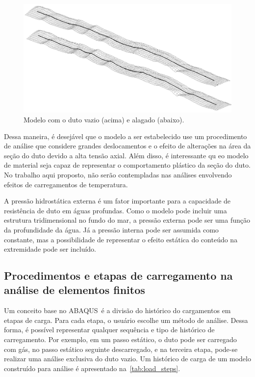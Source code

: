 \begin{figure}[!ht]
    \centering
    \caption{Modelo com o duto vazio (acima) e alagado (abaixo).}\label{fig:duto_alagado}
    \includegraphics[width=0.7\linewidth]{imagens/duto_alagado}
\end{figure}

Dessa maneira, é desejável que o modelo a ser estabelecido use um procedimento de análise que considere grandes deslocamentos e o efeito de alterações na área da seção do duto devido a alta tensão axial.
Além disso, é interessante qu eo modelo de material seja capaz de representar o comportamento plástico da seção do duto. No trabalho aqui proposto, não serão contempladas nas análises envolvendo efeitos de carregamentos de temperatura.

A pressão hidrostática externa é um fator importante para a capacidade de resistência de duto em águas profundas.
Como o modelo pode incluir uma estrutura tridimensional no fundo do mar, a pressão externa pode ser uma função da profundidade da água.
Já a pressão interna pode ser assumida como constante, mas a possibilidade de representar o efeito estática do conteúdo na extremidade pode ser incluído.


\subsection{Procedimentos e etapas de carregamento na análise de elementos finitos}


Um conceito base no ABAQUS~é a divisão do histórico do cargamentos em etapas de carga. Para cada etapa, o usuário escolhe um método de análise.
Dessa forma, é possível representar qualquer sequência  e tipo de histórico de carregamento.
Por exemplo, em um passo estático, o duto pode ser carregado com gás, no passo estático seguinte descarregado, e na terceira etapa, pode-se realizar uma análise exclusiva do duto vazio.
Um histórico de carga de um modelo construído para análise é apresentado na~\autoref{tab:load_steps}.


